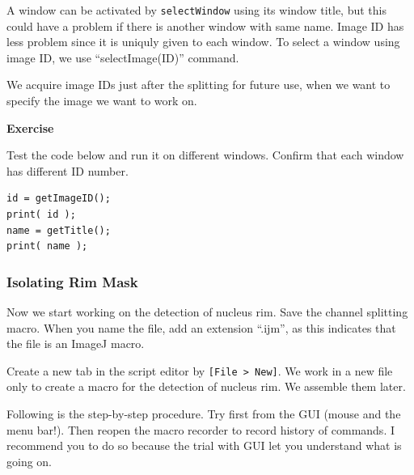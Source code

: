 \documentclass[11pt,a4paper,oneside]{report}
\newenvironment{indentexercise}[1]
{{\setlength{\leftmargin}{2em}}
\textbf{Exercise \thesubsection-#1}
\begin{list}{}
	\item
}
{\end{list}}
\newenvironment{indentCom}
{\begin{list}{}
         {\setlength{\leftmargin}{1em}}
         \item[]
}
{\end{list}}
\newcommand{\ilcom}[1]{\texttt{\small#1}}
\begin{document}
A window can be activated by \ilcom{selectWindow} using its window title, but this could have a problem if there is another window with same name. Image ID has less problem since it is uniquly given to each window. To select a window using image ID, we use ``selectImage(ID)'' command.

\begin{indentCom}

\end{indentCom}

We acquire image IDs just after the splitting for future use, when we want to specify the image we want to work on. 

\begin{indentexercise}{1}
Test the code below and run it on different windows. Confirm that each window has different ID number. 
\begin{lstlisting}
id = getImageID();
print( id );
name = getTitle();
print( name );
\end{lstlisting}
\end{indentexercise}


\subsubsection{Isolating Rim Mask}

Now we start working on the detection of nucleus rim. Save the channel splitting macro. When you name the file, add an extension ``.ijm'', as this indicates that the file is an ImageJ macro. 

Create a new tab in the script editor by \ilcom{[File > New]}. We work in a new file only to create a macro for the detection of nucleus rim. We assemble them later. 

Following is the step-by-step procedure. Try first from the GUI (mouse and the menu bar!). Then reopen the macro recorder to record history of commands. I recommend you to do so because the trial with GUI let you understand what is going on.  
\end{document}
